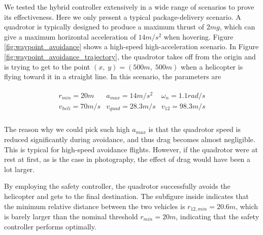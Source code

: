 \documentclass[journal,11pt,onecolumn,draftclsnofoot,]{IEEEtran}
\begin{document}
We tested the hybrid controller extensively in a wide range of scenarios to prove its effectiveness. Here we only present a typical package-delivery scenario. A quadrotor is typically designed to produce a maximum thrust of $2mg$, which can give a maximum horizontal acceleration of $14m/s^2$ when hovering. Figure \ref{fig:waypoint_avoidance} shows a high-speed high-acceleration scenario. In Figure \ref{fig:waypoint_avoidance_trajectory}, the quadrotor takes off from the origin and is trying to get to the point $(x,\;y)=(500m, \; 500m)$ when a helicopter is flying toward it in a straight line. In this scenario, the parameters are

\begin{equation*}
\label{eq:hybrid_param}
\begin{split}
\begin{matrix}
r_{min} = 20 m &
a_{max} = 14 m/s^2&
\omega_n = 1.1 rad/s \\
v_{heli} = 70 m/s &
v_{quad} = 28.3 m/s &
v_{12} = 98.3 m/s \\
\end{matrix}
\end{split}
\end{equation*}

The reason why we could pick such high $a_{max}$ is that the quadrotor speed is reduced significantly during avoidance, and thus drag becomes almost negligible. This is typical for high-speed avoidance flights. However, if the quadrotor were at rest at first, as is the case in photography, the effect of drag would have been a lot larger. 

By employing the safety controller, the quadrotor successfully avoids the helicopter and gets to the final destination. The subfigure inside indicates that the minimum relative distance between the two vehicles is $r_{12,min}=20.6m$, which is barely larger than the nominal threshold $r_{min}=20m$, indicating that the safety controller performs optimally.
\end{document}
